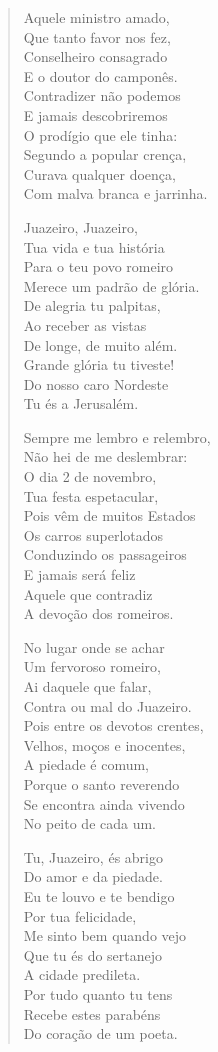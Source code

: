 \begin{verse}
Aquele ministro amado,\\
Que tanto favor nos fez,\\
Conselheiro consagrado\\
E o doutor do camponês.\\
Contradizer não podemos\\
E jamais descobriremos\\
O prodígio que ele tinha:\\
Segundo a popular crença,\\
Curava qualquer doença,\\
Com malva branca e jarrinha.

Juazeiro, Juazeiro,\\
Tua vida e tua história\\
Para o teu povo romeiro\\
Merece um padrão de glória.\\
De alegria tu palpitas,\\
Ao receber as vistas\\
De longe, de muito além.\\
Grande glória tu tiveste!\\
Do nosso caro Nordeste\\
Tu és a Jerusalém.

Sempre me lembro e relembro,\\
Não hei de me deslembrar:\\
O dia 2 de novembro,\\
Tua festa espetacular,\\
Pois vêm de muitos Estados\\
Os carros superlotados\\
Conduzindo os passageiros\\
E jamais será feliz\\
Aquele que contradiz\\
A devoção dos romeiros.

No lugar onde se achar\\
Um fervoroso romeiro,\\
Ai daquele que falar,\\
Contra ou mal do Juazeiro.\\
Pois entre os devotos crentes,\\
Velhos, moços e inocentes,\\
A piedade é comum,\\
Porque o santo reverendo\\
Se encontra ainda vivendo\\
No peito de cada um.

Tu, Juazeiro, és abrigo\\
Do amor e da piedade.\\
Eu te louvo e te bendigo\\
Por tua felicidade,\\
Me sinto bem quando vejo\\
Que tu és do sertanejo\\
A cidade predileta.\\
Por tudo quanto tu tens\\
Recebe estes parabéns\\
Do coração de um poeta.
\end{verse}

